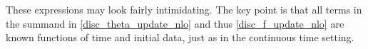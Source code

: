 \documentclass[english]{article}
\begin{document}
These expressions may look fairly intimidating. The key point is that all terms in the summand in \eqref{disc_theta_update_nlo} and thus \eqref{disc_f_update_nlo} are known functions of time and initial data, just as in the continuous time setting.



\end{document}
